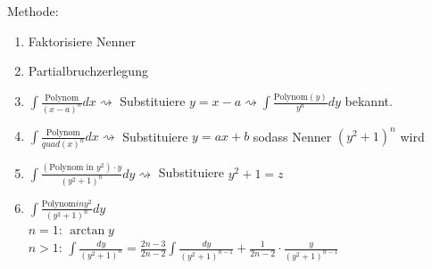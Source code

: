 Methode:
\begin{enumerate}[label=(\arabic*)]
	\item Faktorisiere Nenner
	\item Partialbruchzerlegung
	\item $\int \frac{\text{Polynom}}{(x-a)^n} dx \rightsquigarrow$ Substituiere $y = x-a \rightsquigarrow \int \frac{\text{Polynom}(y)}{y^n} dy$ bekannt.
	\item $\int \frac{\text{Polynom}}{quad(x)^n} dx \rightsquigarrow$ Substituiere $y = ax+b$ sodass Nenner $(y^2+1)^n$ wird
	\item $\int \frac{(\text{Polynom in } y^2) \cdot y}{(y^2+1)^n} dy \rightsquigarrow$ Substituiere $y^2+1 = z$
	\item $\int \frac{\text{Polynom} in y^2}{(y^2+1)^n} dy$ \\
		$n=1$: $\arctan y$ \\
		$n>1$: $\int \frac{dy}{(y^2+1)^n} = \frac{2n-3}{2n-2} \int \frac{dy}{(y^2+1)^{n-1}} + \frac{1}{2n-2} \cdot \frac{y}{(y^2+1)^{n-1}}$
\end{enumerate}


